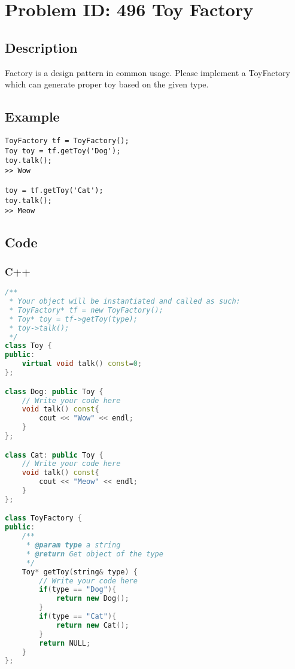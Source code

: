 \section{Problem ID: 496 Toy Factory}
\subsection{Description}
Factory is a design pattern in common usage. Please implement a ToyFactory which can generate proper toy based on the given type.

\subsection{Example}
\scriptsize
\begin{lstlisting}
ToyFactory tf = ToyFactory();
Toy toy = tf.getToy('Dog');
toy.talk();
>> Wow

toy = tf.getToy('Cat');
toy.talk();
>> Meow
\end{lstlisting}

\subsection{Code}
\scriptsize
\subsubsection{C++}
\begin{lstlisting}[language=C++]
/**
 * Your object will be instantiated and called as such:
 * ToyFactory* tf = new ToyFactory();
 * Toy* toy = tf->getToy(type);
 * toy->talk();
 */
class Toy {
public:
    virtual void talk() const=0;
};

class Dog: public Toy {
    // Write your code here
    void talk() const{
        cout << "Wow" << endl;
    }
};

class Cat: public Toy {
    // Write your code here
    void talk() const{
        cout << "Meow" << endl;
    }
};

class ToyFactory {
public:
    /**
     * @param type a string
     * @return Get object of the type
     */
    Toy* getToy(string& type) {
        // Write your code here
        if(type == "Dog"){
            return new Dog();
        }
        if(type == "Cat"){
            return new Cat();
        }
        return NULL;
    }
};
\end{lstlisting}

